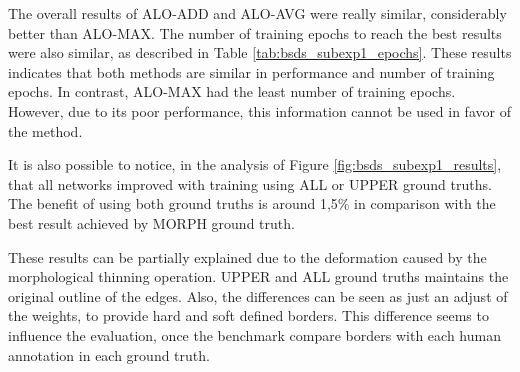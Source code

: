 The overall results of ALO-ADD and ALO-AVG were really similar, considerably better than ALO-MAX. %
The number of training epochs to reach the best results were also similar, as described in Table \ref{tab:bsds_subexp1_epochs}. %
These results indicates that both methods are similar in performance and number of training epochs.
In contrast, ALO-MAX had the least number of training epochs.
However, due to its poor performance, this information cannot be used in favor of the method.

It is also possible to notice, in the analysis of Figure \ref{fig:bsds_subexp1_results}, that all networks improved with training using ALL or UPPER ground truths.
The benefit of using both ground truths is around 1,5\% in comparison with the best result achieved by MORPH ground truth.



These results can be partially explained due to the deformation caused by the morphological thinning operation.
UPPER and ALL ground truths maintains the original outline of the edges.
Also, the differences can be seen as just an adjust of the weights, to provide hard and soft defined borders.
This difference seems to influence the evaluation, once the benchmark compare borders with each human annotation in each ground truth.

